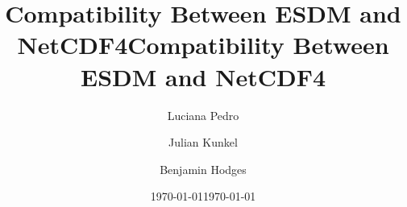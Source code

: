 \documentclass[a4paper,12pt]{esiwace-modified}
\title{Compatibility Between ESDM and NetCDF4}
\author{
Luciana Pedro
\and Julian Kunkel
\and Benjamin Hodges
}
\date{\today} %
\begin{document}
\title{Compatibility Between ESDM and NetCDF4}
\date{\today}

\maketitle

\tableofcontents

\parskip 12pt


\newpage



\clearpage



\clearpage











\clearpage



\clearpage



\clearpage



\clearpage



\clearpage



% 

\begin{appendices}

\end{appendices}

\end{document}
